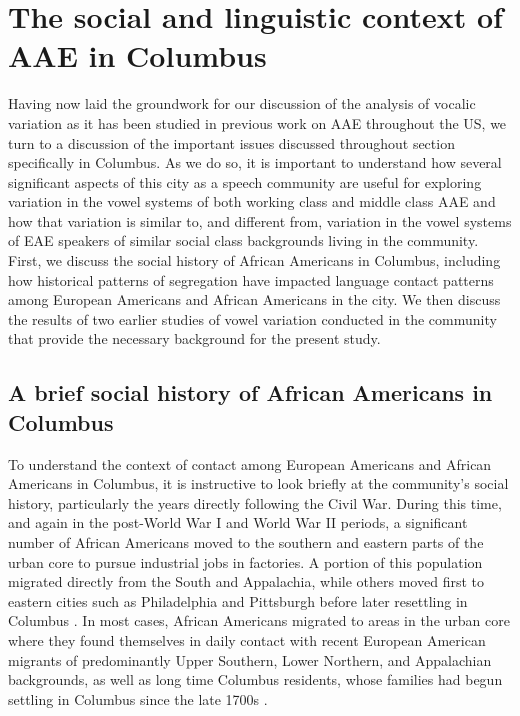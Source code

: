 \documentclass[output=paper,colorlinks,citecolor=brown]{langscibook}
\begin{document}
\section{The social and linguistic context of AAE in Columbus} \label{sec:durian:3}

Having now laid the groundwork for our discussion of the analysis of vocalic variation as it has been studied in previous work on AAE throughout the US, we turn to a discussion of the important issues discussed throughout section  specifically in Columbus. As we do so, it is important to understand how several significant aspects of this city as a speech community are useful for exploring variation in the vowel systems of both working class and middle class AAE and how that variation is similar to, and different from, variation in the vowel systems of EAE speakers of similar social class backgrounds living in the community. First, we discuss the social history of African Americans in Columbus, including how historical patterns of segregation have impacted language contact patterns among European Americans and African Americans in the city. We then discuss the results of two earlier studies of vowel variation conducted in the community that provide the necessary background for the present study.


\subsection{A brief social history of African Americans in Columbus}

To understand the context of contact among European Americans and African Americans in Columbus, it is instructive to look briefly at the community’s social history, particularly the years directly following the Civil War. During this time, and again in the post-World War I and World War II periods, a significant number of African Americans moved to the southern and eastern parts of the urban core to pursue industrial jobs in factories. A portion of this population migrated directly from the South and Appalachia, while others moved first to eastern cities such as Philadelphia and Pittsburgh before later resettling in Columbus \citep{Bryant1983,murphy1970}. In most cases, African Americans migrated to areas in the urban core where they found themselves in daily contact with recent European American migrants of predominantly Upper Southern, Lower Northern, and Appalachian backgrounds, as well as long time Columbus residents, whose families had begun settling in Columbus since the late 1700s \citep{lentz2003columbus}.
\end{document}
